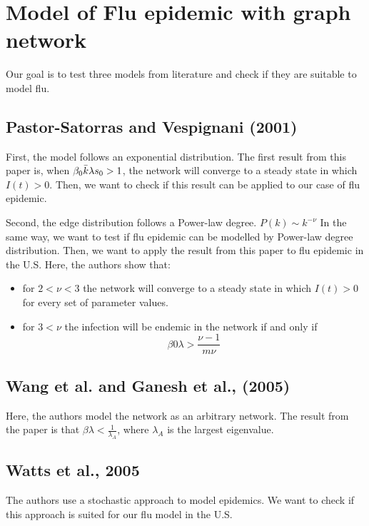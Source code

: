 \section{Model of Flu epidemic with graph network}

Our goal is to test three models from literature and check if they are suitable to model flu.

\subsection{Pastor-Satorras and Vespignani (2001) \cite{PhysRevLett.86.3200}}

First, the model follows an exponential distribution.
The first result from this paper is, when $\beta_{0} \Bar{k} \lambda s_0>1$, the network will converge to a steady state in which $I(t) > 0$. Then, we want to check if this result can be applied to our case of flu epidemic.

Second, the edge distribution follows a Power-law degree. $P(k) \sim k^{-\nu}$
In the same way, we want to test if flu epidemic can be modelled by Power-law degree distribution.
Then, we want to apply the result from this paper to flu epidemic in the U.S.
Here, the authors show that:
\begin{itemize}
    \item for $2<\nu<3$ the network will converge to a steady state in which $I(t)>0$ for every set of parameter values.
    \item for $3<\nu$ the infection will be endemic in the network if and only if 
    $$\beta0 \lambda > \frac{\nu-1}{m \nu}$$
\end{itemize}


\subsection{Wang et al. and Ganesh et al., (2005) \cite{wang2003epidemic,ganesh2005effect}}

Here, the authors model the network as an arbitrary network.
The result from the paper is that $\beta \lambda < \frac{1}{\lambda_{A}}$, where $\lambda_A$ is the largest eigenvalue.


\subsection{Watts et al., 2005 \cite{watts2005multiscale}
}

The authors use a stochastic approach to model epidemics. We want to check if this approach is suited for our flu model in the U.S.

